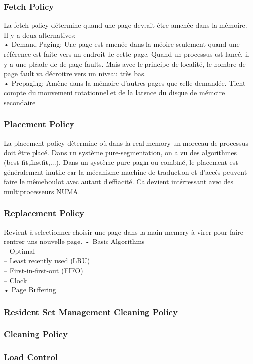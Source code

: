 \subsubsection{Fetch Policy}
La fetch policy détermine quand une page devrait être amenée dans la mémoire. Il y a deux alternatives:\\
• Demand Paging: Une page est amenée dans la méoire seulement quand une référence est faite vers un endroit de cette page. Quand un processus est lancé, il y a une pléade de de page faults. Mais avec le principe de localité, le nombre de page fault va décroitre vers un niveau très bas.\\
• Prepaging: Amène dans la mémoire d’autres pages que celle demandée. Tient compte du mouvement rotationnel et de la latence du disque de mémoire secondaire.\\
\subsubsection{Placement Policy}
La placement policy détermine où dans la real memory un morceau de processus doit être placé. Dans un système pure-segmentation, on a vu des algorithmes (best-fit,firstfit,...). Dans un système pure-pagin ou combiné, le placement est généralement inutile car la mécanisme machine de traduction et d’accès peuvent faire le mêmeboulot avec autant d’effiacité. Ca devient intérressant avec des multiprocesseurs NUMA.
\subsubsection{Replacement Policy}
Revient à selectionner choisir une page dans la main memory à virer pour faire rentrer une nouvelle page.
• Basic Algorithms\\
– Optimal\\
– Least recently used (LRU)\\
– First-in-first-out (FIFO) \\
– Clock\\
• Page Buffering
\subsubsection{Resident Set Management Cleaning Policy}
\subsubsection{Cleaning Policy}
\subsubsection{Load Control}

